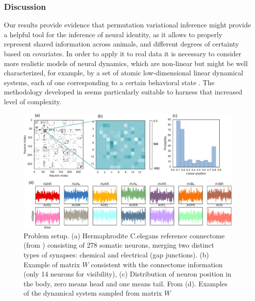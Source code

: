 \documentclass[twoside]{article}
\begin{document}
\subsubsection{Discussion}
Our results provide evidence that permutation variational inference might provide a helpful tool for the inference of neural identity, as it allows to properly represent shared information across animals, and different degrees of certainty based on covariates. In order to apply it to real data it is necessary to consider more realistic models of neural dynamics, which are non-linear but might be well characterized, for example, by a set of atomic low-dimensional linear dynamical systems, each of one corresponding to a certain behavioral state  \cite{Kato2015}. The methodology developed in \cite{Linderman2016} seems particularly suitable to harness that increased level of complexity. \begin{figure}[h!]
  \centering
  \includegraphics[width=5.in]{../figures/figure6.pdf} 
  \caption{Problem setup. (a) Hermaphrodite C.elegans reference connectome (from \cite{varshney2011structural,wormatlas}) consisting of 278 somatic neurons, merging two distinct types of synapses: chemical and electrical (gap junctions). (b) Example of matrix $W$ consistent with the connectome information (only 14 neurons for visibility), (c) Distribution of neuron position in the body, zero means head and one means tail. From \cite{white1986structure,wormatlas}  (d). Examples of the dynamical system sampled from matrix $W$}
\label{fig:connectome}
\end{figure}
\end{document}
